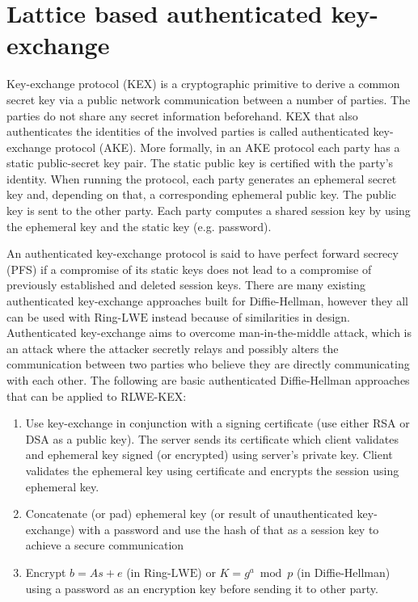 \section{Lattice based authenticated key-exchange}
Key-exchange protocol (KEX) is a cryptographic primitive to derive a common secret key via a public network communication between a number of parties. The parties do not share any secret information beforehand. KEX that also authenticates the identities of the involved parties is called authenticated key-exchange protocol (AKE). More formally, in an AKE protocol each party has a static public-secret key pair. The static public key is certified with the party's identity. When running the protocol, each party generates an ephemeral secret key and, depending on that, a corresponding ephemeral public key. The public key is sent to the other party. Each party computes a shared session key by using the ephemeral key and the static key (e.g. password).

An authenticated key-exchange protocol is said to have perfect forward secrecy (PFS) if a compromise of its static keys does not lead to a compromise of previously established and deleted session keys. There are many existing authenticated key-exchange approaches built for Diffie-Hellman, however they all can be used with Ring-$\mathrm{LWE}$ instead because of similarities in design. Authenticated key-exchange aims to overcome man-in-the-middle attack, which is an attack where the attacker secretly relays and possibly alters the communication between two parties who believe they are directly communicating with each other. The following are basic authenticated Diffie-Hellman approaches that can be applied to RLWE-KEX:

\begin{enumerate}
    \item Use key-exchange in conjunction with a signing certificate (use either RSA or DSA as a public key). The server sends its certificate which client validates and ephemeral key signed (or encrypted) using server's private key. Client validates the ephemeral key using certificate and encrypts the session using ephemeral key. 
    \item Concatenate (or pad) ephemeral key (or result of unauthenticated key-exchange) with a password and use the hash of that as a session key to achieve a secure communication
    \item Encrypt $b = A s + e$ (in Ring-$\mathrm{LWE}$) or $K = g^a \bmod p$ (in Diffie-Hellman) using a password as an encryption key before sending it to other party.
\end{enumerate}